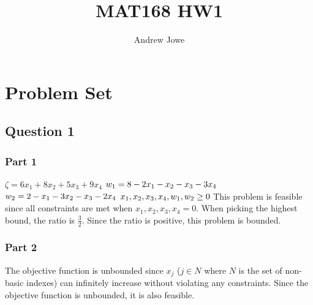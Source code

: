 \documentclass{article}
\title{MAT168 HW1}
\author{Andrew Jowe}
\begin{document}
\maketitle
\section*{Problem Set}
\subsection*{Question 1}
\subsubsection*{Part 1}
$\zeta = 6x_1 + 8x_2 + 5x_3 + 9x_4$
$\\ w_1 = 8 - 2x_1 - x_2 - x_3 - 3x_4$
$\\ w_2 = 2 - x_1 - 3x_2 - x_3 - 2x_4$
$\\ x_1, x_2, x_3, x_4, w_1, w_2 \geq 0$
\newline This problem is feasible since all constraints are met when $x_1, x_2, x_3, x_4 = 0$.
\newline When picking the highest bound, the ratio is $\frac{3}{2}$. Since the ratio is positive, this problem is bounded.

\subsubsection*{Part 2}
The objective function is unbounded since $x_j$ ($j \in N$ where $N$ is the set of non-basic indexes) can infinitely increase without violating any constraints. Since the objective function is unbounded, it is also feasible.
\end{document}
